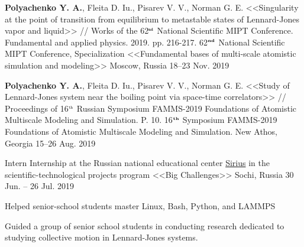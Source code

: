 \begin{cventries}

  \cventry
    {\textbf{Polyachenko Y. A.}, Fleita D. Iu., Pisarev V. V., Norman G. E. <<Singularity at the point of transition from equilibrium to metastable states of Lennard-Jones vapor and liquid>> // Works of the 62$^{\texttt{\tiny nd}}$ National Scientific MIPT Conference. Fundamental and applied physics. 2019. pp. 216-217.} %
    {62$^{\textbf{\tiny nd}}$ National Scientific MIPT Conference, Specialization <<Fundamental bases of multi-scale atomistic simulation and modeling>>} %
    {Moscow, Russia} %
    {18--23 Nov. 2019} %
    {
    }


  \cventry
    {\textbf{Polyachenko Y. A.}, Fleita D. Iu., Pisarev V. V., Norman G. E. <<Study of Lennard-Jones system near the boiling point via space-time correlators>> // Proceedings of 16$^{\texttt{\tiny th}}$ Russian Symposium FAMMS-2019 Foundations of Atomistic Multiscale Modeling and Simulation. P. 10.} %
    {16$^{\textbf{\tiny th}}$ Symposium FAMMS-2019 Foundations of Atomistic Multiscale Modeling and Simulation.} %
    {New Athos, Georgia} %
    {15--26 Aug. 2019} %
    {
    }
    
  \cventry
    {Intern} %
    {Internship at the Russian national educational center \href{https://sochisirius.ru/uploads/f/SiriusAnnualReport2019_en.pdf}{Sirius} in the scientific-technological projects program <<Big Challenges>>} %
    {Sochi, Russia} %
    {30 Jun. -- 26 Jul. 2019} %
    {
      \begin{cvitems} %
        \item {Helped senior-school students master Linux, Bash, Python, and LAMMPS}
        \item {Guided a group of senior school students in conducting research dedicated to studying collective motion in Lennard-Jones systems.}
      \end{cvitems}
    }


\end{cventries}
